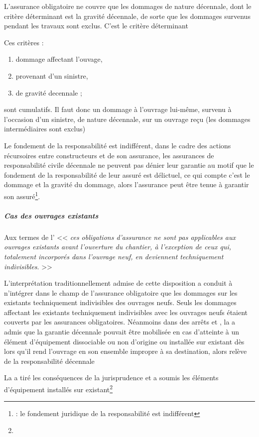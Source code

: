 				L'assurance obligatoire ne couvre que les dommages de nature décennale, dont le critère déterminant est la gravité décennale, de sorte que les dommages survenus pendant les travaux sont exclus. C’est le critère déterminant

				\medbreak Ces critères :
				\begin{enumerate}
					\item dommage affectant l'ouvage,
					\item provenant d'un sinistre,
					\item de gravité decennale ;
				\end{enumerate}
				sont cumulatifs. Il faut donc un dommage à l’ouvrage lui-même, survenu à l’occasion d’un sinistre, de nature décennale, sur un ouvrage reçu (les dommages intermédiaires sont exclus)

				\medbreak Le fondement de la responsabilité est indifférent, dans le cadre des actions récursoires entre constructeurs et de son assurance, les assurances de responsabilité civile décennale ne peuvent pas dénier leur garantie au motif que le fondement de la responsabilité de leur assuré est délictuel, ce qui compte c’est le dommage et la gravité du dommage, alors l’assurance peut être tenue à garantir son assuré\footnote{ : le fondement juridique de la responsabilité est indifférent}.

				\subparagraph{Cas des ouvrages existants}
				Aux termes de l' << {\itshape ces obligations d'assurance ne sont pas applicables aux ouvrages existants avant l'ouverture du chantier, à l'exception de ceux qui, totalement incorporés dans l'ouvrage neuf, en deviennent techniquement indivisibles}. >>

				L’interprétation traditionnellement admise de cette disposition a conduit à n'intégrer dans le champ de l’assurance obligatoire que les dommages sur les existants techniquement indivisibles des ouvrages neufs. Seuls les dommages affectant les existants techniquement indivisibles avec les ouvrages neufs étaient couverts par les assurances obligatoires.
				Néanmoins dans des arrêts  et , la \CourDeCas a admis que la garantie décennale pouvait être mobilisée en cas d’atteinte à un élément d’équipement dissociable ou non d’origine ou installée sur existant dès lors qu’il rend l’ouvrage en son ensemble impropre à sa destination, alors relève de la responsabilité décennale

				La \civTrois a tiré les conséquences de la jurisprudence et a soumis les éléments d'équipement installés sur existant\footnote{}

